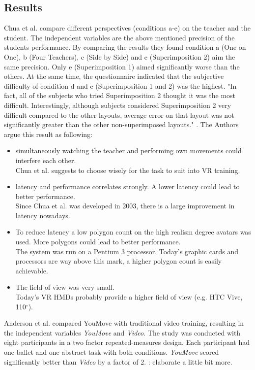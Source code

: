 \subsection{Results}
Chua et al. compare different perspectives (conditions a-e) on the teacher and the student. The independent variables are the above mentioned precision of the students performance. By comparing the results they found condition a (One on One), b (Four Teachers), c (Side by Side) and e (Superimposition 2) aim the same precision. Only e (Superimposition 1) aimed significantly worse than the others. At the same time, the questionnaire indicated that the subjective difficulty of condition d and e (Superimposition 1 and 2) was the highest. "In fact, all of the subjects who tried Superimposition 2 thought it was the most difficult. Interestingly, although subjects considered Superimposition 2 very difficult compared to the other layouts, average error on that layout was not significantly greater than the other non-superimposed layouts." \cite{Chua}. The Authors argue this result as following:
\begin{itemize}
	\item simultaneously watching the teacher and performing own movements could interfere each other.\\
	Chua et al. suggests to choose wisely for the task to suit into VR training.
	\item latency and performance correlates strongly. A lower latency could lead to better performance.\\
	Since Chua et al. \cite{Chua} was developed in 2003, there is a large improvement in latency nowadays.
	\item To reduce latency a low polygon count on the high realism degree avatars was used. More polygons could lead to better performance.\\
	The system was run on a Pentium 3 processor. Today's graphic cards and processors are way above this mark, a higher polygon count is easily achievable.
	\item The field of view was very small.\\
	Today's VR HMDs probably provide a higher field of view (e.g. HTC Vive, 110$^\circ$).
\end{itemize}
Anderson et al. compared YouMove with traditional video training, resulting in the independent variables \textit{YouMove} and \textit{Video}. The study was conducted with eight participants in a two factor repeated-measures design. Each participant had one ballet and one abstract task with both conditions. \textit{YouMove} scored significantly better than \textit{Video} by a factor of 2. \todo: elaborate a little bit more.
